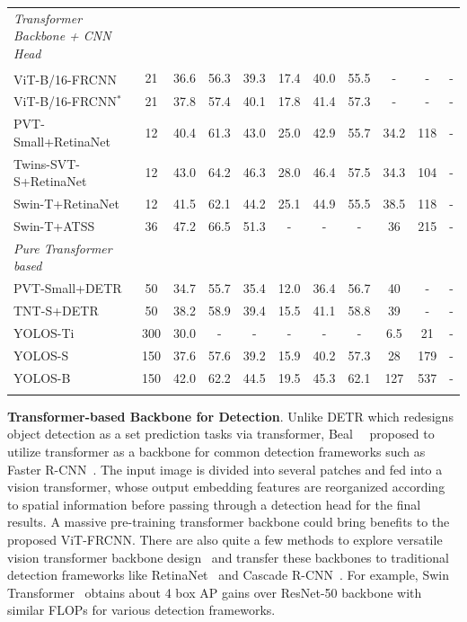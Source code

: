 \begin{table}[ht]
\begin{center}
{\begin{tabular}{l|c|cccccc|ccl}
				\hline
				\textit{Transformer Backbone + CNN Head} &&&&&&&&&&\\
				ViT-B/16-FRCNN\textsuperscript\textdaggerdbl
				~ & 21 & 36.6 & 56.3 & 39.3 & 17.4 & 40.0 & 55.5 &- & -& -  \\
				ViT-B/16-FRCNN$^*$~ & 21 & 37.8 &  57.4 & 40.1 & 17.8 & 41.4 & 57.3 & - & -& -  \\
				PVT-Small+RetinaNet~ & 12 & 40.4 & 61.3 & 43.0 & 25.0 & 42.9 & 55.7 & 34.2 & 118 & - \\ 
				Twins-SVT-S+RetinaNet~ & 12 & 43.0 & 64.2 & 46.3 & 28.0 & 46.4 & 57.5 & 34.3 & 104 & - \\ 
				Swin-T+RetinaNet~ & 12 & 41.5 & 62.1 & 44.2 & 25.1 & 44.9 & 55.5 & 38.5 & 118 & - \\ 
				Swin-T+ATSS~ & 36 & 47.2 & 66.5 & 51.3 & - & - & - & 36 & 215 & - \\ 
				\hline
				\textit{Pure Transformer based} &&&&&&&&&&\\
				PVT-Small+DETR~ & 50 & 34.7 & 55.7 & 35.4 & 12.0 & 36.4 & 56.7 & 40 & - & - \\ 
				TNT-S+DETR~ & 50 & 38.2 & 58.9 & 39.4 & 15.5 & 41.1 & 58.8 & 39 & - & - \\ 
				YOLOS-Ti~ & 300 & 30.0 & - & - & - & - & - & 6.5 & 21 & - \\ 
				YOLOS-S~ & 150 & 37.6 & 57.6 & 39.2 & 15.9 & 40.2 & 57.3 & 28 & 179 & - \\ 
				YOLOS-B~ & 150 & 42.0 & 62.2 & 44.5 & 19.5 & 45.3 & 62.1 & 127 & 537 & - \\ 
				\Xhline{2\arrayrulewidth}
			\end{tabular}
		}
	\end{center}
	\vspace{-1.5em}
\end{table}
\noindent\textbf{Transformer-based Backbone for Detection}. Unlike DETR which redesigns object detection as a set prediction tasks via transformer, Beal~\etal~ proposed to utilize transformer as a backbone for common detection frameworks such as Faster R-CNN~. The input image is divided into several patches and fed into a vision transformer, whose output embedding features are reorganized according to spatial information before passing through a detection head for the final results. A massive pre-training transformer backbone could bring benefits to the proposed ViT-FRCNN. There are also quite a few methods to explore versatile vision transformer backbone design~ and transfer these backbones to traditional detection frameworks like RetinaNet~ and Cascade R-CNN~. For example, Swin Transformer~ obtains about 4 box AP gains over ResNet-50 backbone with similar FLOPs for various detection frameworks.
